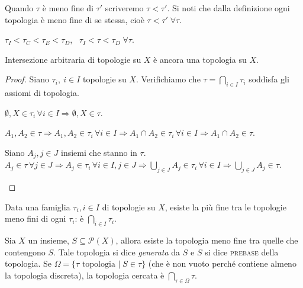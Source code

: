 \documentclass{article}
\begin{document}
Quando $\tau$ è meno fine di $\tau'$ scriveremo $\tau < \tau'$. Si noti che
dalla definizione ogni topologia è meno fine di se stessa, cioè $\tau < \tau'
\; \forall \tau$.

\begin{ex}
	$\tau_I < \tau_C < \tau_E < \tau_D$, \, $\tau_I < \tau < \tau_D \; \forall
	\tau$.
\end{ex}

\begin{lm}
	Intersezione arbitraria di topologie su $X$ è ancora una topologia su $X$.
\end{lm}

\begin{proof}
Siano $\tau_i,\ i \in I$ topologie su $X$.
Verifichiamo che $ \tau=\bigcap_{i \in I} \tau_i$ soddisfa gli assiomi di
topologia.

\begin{nlist}
\item $\emptyset, X \in \tau_i \, \forall i \in I \Rightarrow \emptyset, X \in
\tau$.
\item $A_1, A_2 \in \tau \Rightarrow A_1, A_2 \in \tau_i \, \forall i
\in I \Rightarrow A_1 \cap A_2 \in \tau_i \, \forall i \in I \Rightarrow A_1
\cap A_2 \in \tau$.
\item Siano $A_j, j \in J$ insiemi che stanno in $\tau$. \\
$\displaystyle A_j \in \tau \, \forall j \in J \Rightarrow A_j \in \tau_i \,
\forall i \in I, j \in J \Rightarrow {\bigcup_{j \in J} A_j \in \tau_i \,
\forall i \in I} \Rightarrow {\bigcup_{j \in J} A_j \in \tau}$.
\end{nlist}
\end{proof}

\begin{cor}
	Data una famiglia $\tau_i, i \in I$ di topologie su $X$, esiste la più fine
	tra le topologie meno fini di ogni $\tau_i$: è $\displaystyle \bigcap_{i \in
	I} \tau_i$.
\end{cor}

\begin{cor}
	Sia $X$ un insieme, $S \subseteq \mathcal{P}(X)$, allora esiste la topologia
	meno fine tra quelle che contengono $S$. Tale topologia si dice
	\textit{generata} da $S$ e $S$ si dice \textsc{prebase} della topologia. Se
	$\Omega= \{ \tau \text{ topologia } |\; S \in \tau \}$ (che è non vuoto
	perché contiene almeno la topologia discreta), la topologia cercata è
	$\displaystyle \bigcap_{\tau \in \Omega} \tau$.
\end{cor}
\end{document}
